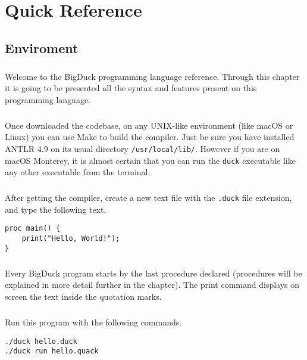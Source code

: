 
\chapter{Quick Reference}

\section{Enviroment}

\paragraph{} Welcome to the BigDuck programming language reference. Through
this chapter it is going to be presented all the syntax and features present
on this programming language.

\paragraph{} Once downloaded the codebase, on any UNIX-like environment (like
macOS or Linux) you can use Make to build the compiler. Just be sure you have
installed ANTLR 4.9 on its usual directory \texttt{/usr/local/lib/}. However
if you are on macOS Monterey, it is almost certain that you can run the
\texttt{duck} executable like any other executable from the terminal.

\paragraph{} After getting the compiler, create a new text file with the
\texttt{.duck} file extension, and type the following text.
\begin{verbatim}
proc main() {
    print("Hello, World!");
}
\end{verbatim}
\paragraph{} Every BigDuck program starts by the last procedure declared
(procedures will be explained in more detail further in the chapter). The print
command displays on screen the text inside the quotation marks.

\paragraph{} Run this program with the following commands.
\begin{verbatim}
./duck hello.duck
./duck run hello.quack
\end{verbatim}
